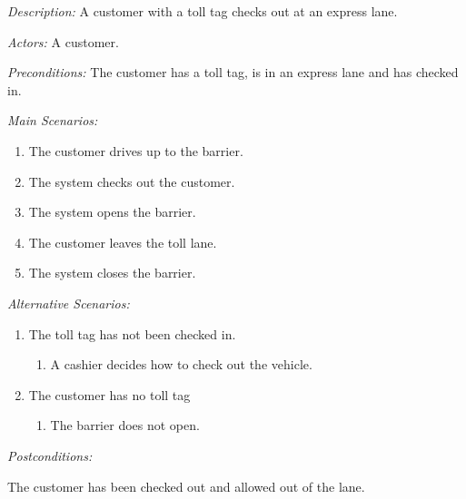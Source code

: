 \textit{Description:}
A customer with a toll tag checks out at an express lane.


\textit{Actors:}
A customer.


\textit{Preconditions:}
The customer has a toll tag, is in an express
lane and has checked in.


\textit{Main Scenarios:}
\begin{enumerate}
\item The customer drives up to the barrier.
\item The system checks out the customer.
\item The system opens the barrier.
\item The customer leaves the toll lane.
\item The system closes the barrier.
\end{enumerate}

\textit{Alternative Scenarios:}
\begin{enumerate}
\item The toll tag has not been checked in.

\begin{enumerate}
\item A cashier decides how to check out the vehicle.
\end{enumerate}
\item The customer has no toll tag

\begin{enumerate}
\item The barrier does not open.
\end{enumerate}
\end{enumerate}

\textit{Postconditions:}

The customer has been checked out and allowed out of the lane.

